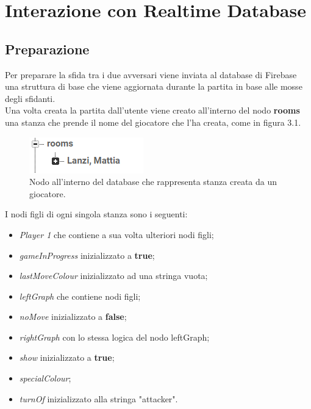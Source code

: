 \documentclass[a4paper,11pt,twoside,openright]{report}
\begin{document}
\section{Interazione con Realtime Database}
\subsection{Preparazione}
Per preparare la sfida tra i due avversari viene inviata al database di Firebase una struttura di base che viene aggiornata durante la partita in base alle mosse degli sfidanti.\\
Una volta creata la partita dall'utente viene creato all'interno del nodo \textbf{rooms} una stanza che prende il nome del giocatore che l'ha creata, come in figura 3.1.\\
\begin{figure}[h]
\includegraphics{images/Room node.png}
\caption{Nodo all'interno del database che rappresenta stanza creata da un giocatore.}
\end{figure}

I nodi figli di ogni singola stanza sono i seguenti:

\begin{itemize}
\item \textit{Player 1} che contiene a sua volta ulteriori nodi figli;

\item \textit{gameInProgress} inizializzato a \textbf{true};

\item \textit{lastMoveColour} inizializzato ad una stringa vuota;

\item \textit{leftGraph} che contiene nodi figli;

\item \textit{noMove} inizializzato a \textbf{false};

\item \textit{rightGraph} con lo stessa logica del nodo leftGraph;

\item \textit{show} inizializzato a \textbf{true};

\item \textit{specialColour};

\item \textit{turnOf} inizializzato alla stringa "attacker".
\end{itemize}
\end{document}
